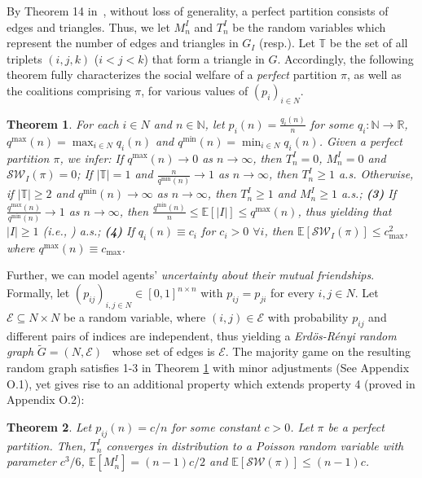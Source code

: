 \documentclass[letterpaper]{article}
\newtheorem{theorem}{Theorem}
\begin{document}
By Theorem 14 in~\cite{peters2016complexity}, without loss of generality, a perfect partition consists of edges and triangles. Thus, we let $M_n^I$ and $T_n^I$ be the random variables which represent the number of edges and triangles in $G_I$ (resp.). Let $\mathbb{T}$ be the set of all triplets $(i,j,k)$ ($i<j<k$) that form a triangle in $G$. Accordingly, the following theorem fully characterizes the social welfare of a \textit{perfect} partition $\pi$, as well as the coalitions comprising $\pi$, for various values of $(p_i)_{i \in N}$.
\begin{theorem}
\label{theorem:perfect}
For each $i \in N$ and $n \in \mathbb{N}$, let $p_i(n) = \frac{q_i(n)}{n}$ for some $q_i : \mathbb{N} \rightarrow \mathbb{R}$, $q^{\max}(n) = \max_{i \in N} q_i(n)$ and $q^{\min}(n) = \min_{i \in N} q_i(n)$. Given a perfect partition $\pi$, we infer: {} If $q^{\max}(n) \rightarrow 0$ as $n \rightarrow \infty$, then $T_n^I = 0$, $M_n^I = 0$ and $\mathcal{SW}_I(\pi) = 0$; {} If $|\mathbb{T}| = 1$ and $\frac{n}{q^{\min}(n)} \rightarrow 1$ as $n \rightarrow \infty$, then $T_n^I \geq 1$ a.s. Otherwise, if $|\mathbb{T}| \geq 2$ and $q^{\min}(n) \rightarrow \infty$ as $n \rightarrow \infty$, then $T_n^I \geq 1$ and $M_n^I \geq 1$ a.s.; {\normalfont \textbf{(3)}} If $\frac{q^{\max}(n)}{q^{\min}(n)} \rightarrow 1$ as $n \rightarrow \infty$, then $\frac{q^{\min}(n)}{n} \leq \mathbb{E}[|I|] \leq q^{\max}(n)$, thus yielding that $|I| \geq 1$ (i.e., {}) a.s.; {\normalfont \textbf{(4)}} If $q_i(n) \equiv c_i$ for $c_i > 0$ $\forall i$, then $\mathbb{E}[\mathcal{SW}_I(\pi)] \leq c_{\max}^2$, where $q^{\max}(n) \equiv c_{\max}$.
\end{theorem}

Further, we can model agents' \textit{uncertainty about their mutual friendships}. Formally, let $(p_{ij})_{i, j \in N} \in [0,1]^{n \times n}$ with $p_{ij} = p_{ji}$ for every $i, j \in N$. Let $\mathcal{E} \subseteq N \times N$ be a random variable, where $(i,j) \in \mathcal{E}$ with probability $p_{ij}$ and different pairs of indices are independent, thus yielding a \textit{Erd\"{o}s-R\'{e}nyi random graph} $\tilde{G}=(N,\mathcal{E})$~\cite{erdos59random} whose set of edges is $\mathcal{E}$. The majority game on the resulting random graph satisfies 1-3 in Theorem \ref{theorem:perfect} with minor adjustments (See Appendix O.1), yet gives rise to an additional property which extends property 4 (proved in Appendix O.2):%
\begin{theorem}
\label{theorem:perfect-random-graph}
Let $p_{ij}(n) = c/n$ for some constant $c > 0$. Let $\pi$ be a perfect partition. Then, $T_n^I$ converges in distribution to a Poisson random variable with parameter $c^3/6$, $\mathbb{E}[M_n^I] = (n-1) c/2$ and $\mathbb{E}[\mathcal{SW}(\pi)] \leq (n-1) c$.
\end{theorem}
\end{document}

